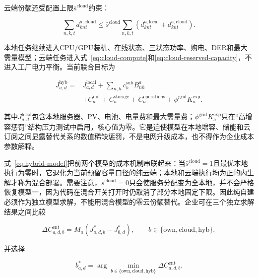 \documentclass[preprint]{elsarticle}
\begin{document}
云端份额还受配置上限$\bar s^{\mathrm{cloud}}$约束：

\begin{equation}
 \sum_{n,k,t}d^{a,\mathrm{cloud}}_{knt}
 \leq\bar s^{\mathrm{cloud}}
 \sum_{n,k,t}\left(d^{a,\mathrm{local}}_{knt}
 +d^{a,\mathrm{cloud}}_{knt}\right).
 \label{eq:maximum-cloud-share}
\end{equation}

本地任务继续进入CPU/GPU装机、在线状态、三状态功率、购电、DER和最大需量模型；云端任务进入式~\eqref{eq:cloud-compute}和\eqref{eq:cloud-reserved-capacity}，不进入工厂电力平衡。当前联合目标为

\begin{equation}
\begin{aligned}
 J^{\mathrm{hyb}}_{a,d}={}&J^{\mathrm{local}}_{a,d}
 +\sum_{n,h}c_h^{\mathrm{sub}}B^a_{nh}\\
 &+C_a^{\mathrm{init}}+C_a^{\mathrm{storage}}
 +C_a^{\mathrm{operations}}+\phi^{\mathrm{grid}}K_a^{\mathrm{exp}}.
\end{aligned}
 \label{eq:hybrid-model}
\end{equation}

其中$J^{\mathrm{local}}_{a,d}$包含本地服务器、PV、电池、电量费和最大需量费；$\phi^{\mathrm{grid}}K_a^{\mathrm{exp}}$只在“高增容惩罚”结构压力测试中启用，核心值为零。它是迫使模型在本地增容、储能和云订阅之间显露替代关系的数值稀缺惩罚，不是电网升级成本，也不得作为企业成本参数解释。

式~\eqref{eq:hybrid-model}把前两个模型的成本机制串联起来：当$\bar s^{\mathrm{cloud}}=1$且最优本地执行为零时，它退化为当前预留容量口径的纯云端；本地和云端执行均为正的内生解才称为混合部署。需要注意，$\bar s^{\mathrm{cloud}}=0$只会使服务分配变为全本地，并不会严格恢复模型一，因为代码在混合开关打开时仍取消了部分本地固定下限。因此纯自建必须作为独立模型求解，不能用混合模型的零云份额替代。企业可在三个独立求解结果之间比较

\begin{equation}
 \Delta C^{\mathrm{ent}}_{a,d,b}
 =M_a\left(J^{*}_{a,d,b}-J^{*}_{0,d}\right),
 \qquad b\in\{\mathrm{own},\mathrm{cloud},\mathrm{hyb}\},
 \label{eq:procurement-incremental-cost}
\end{equation}

并选择

\begin{equation}
 b_{a,d}^{*}=\arg\min_{b\in
 \{\mathrm{own},\mathrm{cloud},\mathrm{hyb}\}}
 \Delta C^{\mathrm{ent}}_{a,d,b}.
 \label{eq:procurement-choice}
\end{equation}
\end{document}
